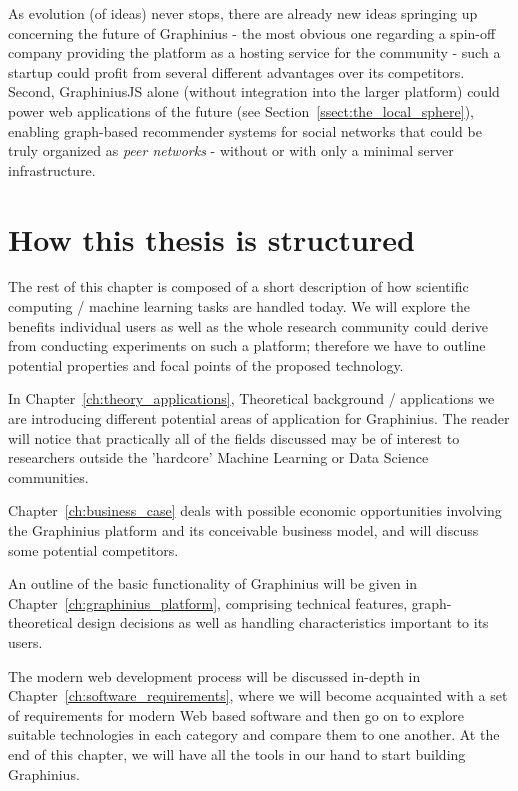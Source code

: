 As evolution (of ideas) never stops, there are already new ideas springing up concerning the future of Graphinius - the most obvious one regarding a spin-off company providing the platform as a hosting service for the community - such a startup could profit from several different advantages over its competitors. Second, GraphiniusJS alone (without integration into the larger platform) could power web applications of the future (see Section~\ref{ssect:the_local_sphere}), enabling graph-based recommender systems for social networks that could be truly organized as \textit{peer networks} - without or with only a minimal server infrastructure.


\section{How this thesis is structured}
\label{section:thesis_structure}

The rest of this chapter is composed of a short description of how scientific computing / machine learning tasks are handled today. We will explore the benefits individual users as well as the whole research community could derive from conducting experiments on such a platform; therefore we have to outline potential properties and focal points of the proposed technology.

In Chapter~\ref{ch:theory_applications}, Theoretical background / applications we are introducing different potential areas of application for Graphinius. The reader will notice that practically all of the fields discussed may be of interest to researchers outside the 'hardcore' Machine Learning or Data Science communities.

Chapter~\ref{ch:business_case} deals with possible economic opportunities involving the Graphinius platform and its conceivable business model, and will discuss some potential competitors.

An outline of the basic functionality of Graphinius will be given in Chapter~\ref{ch:graphinius_platform}, comprising technical features, graph-theoretical design decisions as well as handling characteristics important to its users.

The modern web development process will be discussed in-depth in Chapter~\ref{ch:software_requirements}, where we will become acquainted 
with a set of requirements for modern Web based software and then go on to explore suitable technologies in each category and compare them to one another. At the end of this chapter, we will have all the tools in our hand to start building Graphinius.

